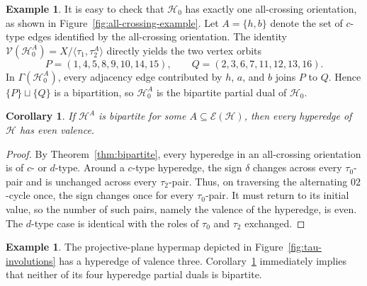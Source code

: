 \documentclass{article}
\newtheorem{corollary}[theorem]{Corollary}
\theoremstyle{definition}
\newtheorem{example}[theorem]{Example}
\theoremstyle{remark}
\newcommand{\Hcal}{\mathcal{H}}
\newcommand{\Ecal}{\mathcal{E}}
\begin{document}
\begin{example}\label{ex:mixed-partials}
It is easy to check that $\Hcal_0$ has exactly one all-crossing orientation, as shown in Figure~\ref{fig:all-crossing-example}.
Let $A=\{h,b\}$ denote the set of $c$-type edges identified by the all-crossing orientation. The identity $\mathcal V(\Hcal_0^A)=X/\langle\tau_1,\tau_2^A\rangle$ directly yields the two vertex orbits
\[
 P=(1,4,5,8,9,10,14,15),\qquad
 Q=(2,3,6,7,11,12,13,16).
\]
In $\Gamma(\Hcal_0^A)$, every adjacency edge contributed by $h$, $a$, and $b$ joins $P$ to $Q$. Hence $\{P\}\sqcup\{Q\}$ is a bipartition, so $\Hcal_0^A$ is the bipartite partial dual of $\Hcal_0$.
\end{example}

\begin{corollary}\label{cor:even-obstruction}
If $\Hcal^A$ is bipartite for some $A\subseteq\Ecal(\Hcal)$, then every hyperedge of $\Hcal$ has even valence.
\end{corollary}

\begin{proof}
By Theorem~\ref{thm:bipartite}, every hyperedge in an all-crossing orientation is of $c$- or $d$-type. Around a $c$-type hyperedge, the sign $\delta$ changes across every $\tau_0$-pair and is unchanged across every $\tau_2$-pair. Thus, on traversing the alternating $02$-cycle once, the sign changes once for every $\tau_0$-pair. It must return to its initial value, so the number of such pairs, namely the valence of the hyperedge, is even. The $d$-type case is identical with the roles of $\tau_0$ and $\tau_2$ exchanged.
\end{proof}

\begin{example}\label{ex:odd-hyperedge}
The projective-plane hypermap depicted in Figure~\ref{fig:tau-involutions} has a hyperedge of valence three. Corollary~\ref{cor:even-obstruction} immediately implies that neither of its four hyperedge partial duals is bipartite.
\end{example}
\end{document}
